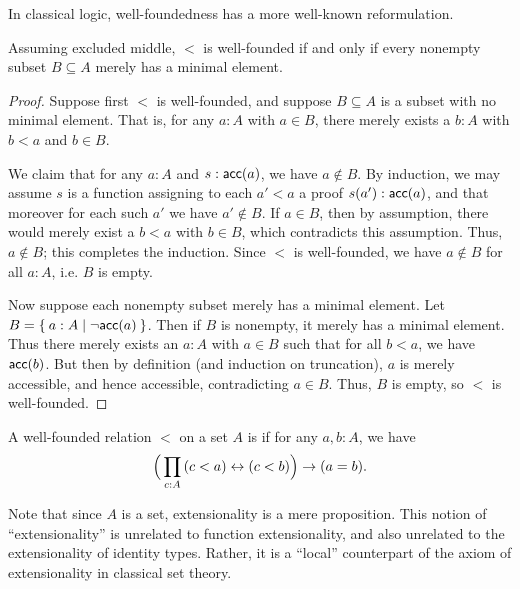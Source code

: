 In classical logic, well-foundedness has a more well-known reformulation.

\begin{lem}\label{thm:wfmin}
  Assuming excluded middle, $<$ is well-founded if and only if every nonempty subset $B\subseteq A$ merely has a minimal element.
\end{lem}
\begin{proof}
  Suppose first $<$ is well-founded, and suppose $B\subseteq A$ is a subset with no minimal element.
  That is, for any $a:A$ with $a\in B$, there merely exists a $b:A$ with $b<a$ and $b\in B$.

  We claim that for any $a:A$ and $s:\mathsf{acc}(a)$, we have $a\notin B$.
  By induction, we may assume $s$ is a function assigning to each $a'<a$ a proof $s(a'):\mathsf{acc}(a)$, and that moreover for each such $a'$ we have $a'\notin B$.
  If $a\in B$, then by assumption, there would merely exist a $b<a$ with $b\in B$, which contradicts this assumption.
  Thus, $a\notin B$; this completes the induction.
  Since $<$ is well-founded, we have $a\notin B$ for all $a:A$, i.e. $B$ is empty.

  Now suppose each nonempty subset merely has a minimal element.
  Let $B = \Set{ a:A | \neg \ensuremath{\mathsf{acc}}(a) }$.
  Then if $B$ is nonempty, it merely has a minimal element.
  Thus there merely exists an $a:A$ with $a\in B$ such that for all $b<a$, we have $\mathsf{acc}(b)$.
  But then by definition (and induction on truncation), $a$ is merely accessible, and hence accessible, contradicting $a\in B$.
  Thus, $B$ is empty, so $<$ is well-founded.
\end{proof}

\begin{defn}
  A well-founded relation $<$ on a set $A$ is  if for any $a,b:A$, we have
  \[ \Big(\prd{c:A} (c<a) \leftrightarrow (c<b)\Big) \to (a=b). \]
\end{defn}

Note that since $A$ is a set, extensionality is a mere proposition.
This notion of ``extensionality'' is unrelated to function extensionality, and also unrelated to the extensionality of identity types.
Rather, it is a ``local'' counterpart of the axiom of extensionality in classical set theory.

